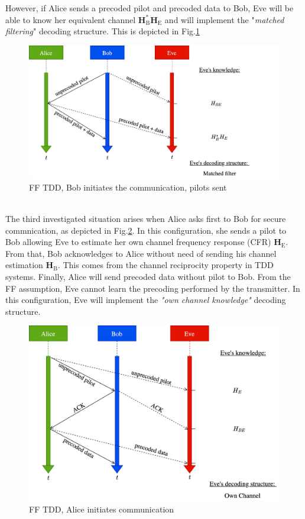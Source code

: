 \documentclass[journal,comsoc]{IEEEtran}
\let\MYoriglatexcaption\caption
\renewcommand{\caption}[2][\relax]{\MYoriglatexcaption[#2]{#2}}
\newcommand{\HE}{\textbf{H}_{\text{E}}}
\newcommand{\HB}{\textbf{H}_{\text{B}}}
\begin{document}
However, if Alice sends a precoded pilot and  precoded data to Bob, Eve will be able to know her equivalent channel $\HB^*\HE$ and will implement the "\textit{matched filtering}" decoding structure. This is depicted in Fig.\ref{fig_ff_tdd_b_pilot}
\begin{figure}[!ht]
	\centering
	\includegraphics[width=.95\linewidth]{graphs/diagram_sequence-FF_TDD_B_pilot.jpg}
	\caption{FF TDD, Bob initiates the communication, pilots sent}
	\label{fig_ff_tdd_b_pilot}
\end{figure}\\
The third investigated situation arises when Alice asks first to Bob for secure commnication, as depicted in Fig.\ref{fig_ff_tdd_a}. In this configuration, she sends a pilot to Bob allowing Eve to estimate her own channel frequency response (CFR) $\HE$. From that, Bob acknowledges to Alice without need of sending his channel estimation $\HB$. This comes from the channel reciprocity property in TDD systems. Finally, Alice will send precoded data without pilot to Bob. From the FF assumption, Eve cannot learn the precoding performed by the transmitter. In this configuration, Eve will implement the \textit{"own channel knowledge"} decoding structure. 
\begin{figure}[!ht]
	\centering
	\includegraphics[width=.85\linewidth]{graphs/diagram_sequence-FF_TDD_A.jpg}
	\caption{FF TDD, Alice initiates communication}
	\label{fig_ff_tdd_a}
\end{figure}
\end{document}
